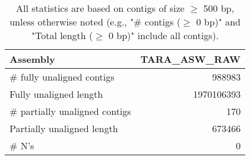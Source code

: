 \documentclass[12pt,a4paper]{article}
\begin{document}
\begin{table}[ht]
\begin{center}
\caption{All statistics are based on contigs of size $\geq$ 500 bp, unless otherwise noted (e.g., "\# contigs ($\geq$ 0 bp)" and "Total length ($\geq$ 0 bp)" include all contigs).}
\begin{tabular}{|l*{1}{|r}|}
\hline
Assembly & TARA\_ASW\_RAW \\ \hline
\# fully unaligned contigs & 988983 \\ \hline
Fully unaligned length & 1970106393 \\ \hline
\# partially unaligned contigs & 170 \\ \hline
Partially unaligned length & 673466 \\ \hline
\# N's & 0 \\ \hline
\end{tabular}
\end{center}
\end{table}
\end{document}
